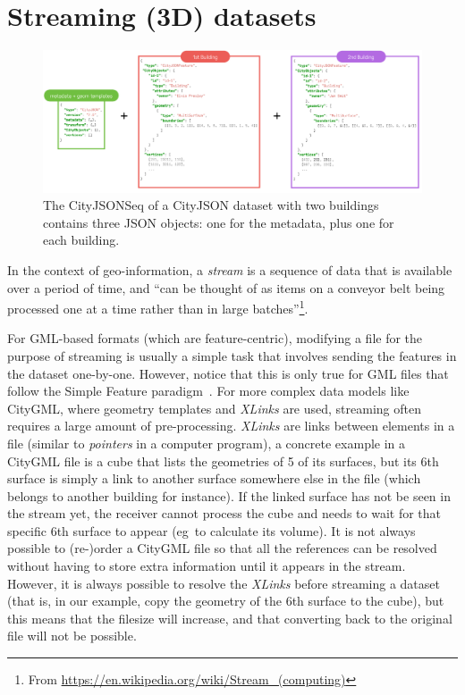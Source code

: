 \documentclass{isprs} %
\newcommand{\eg}{eg}
\begin{document}
\section{Streaming (3D) datasets}%
\label{sec:streaming}
\begin{figure}[th]
  \centering
  \includegraphics[width=0.95\linewidth]{figs/cjseq_idea}
  \caption{The CityJSONSeq of a CityJSON dataset with two buildings contains three JSON objects: one for the metadata, plus one for each building.}%
\label{fig:cjseq_idea}
\end{figure}
In the context of geo-information, a \emph{stream} is a sequence of data that is available over a period of time, and ``can be thought of as items on a conveyor belt being processed one at a time rather than in large batches''\footnote{From \url{https://en.wikipedia.org/wiki/Stream_(computing)}}.

%

For GML-based formats (which are feature-centric), modifying a file for the purpose of streaming is usually a simple task that involves sending the features in the dataset one-by-one.
However, notice that this is only true for GML files that follow the Simple Feature paradigm~\citep{OGC-SF}.
For more complex data models like CityGML, where geometry templates and \emph{XLinks} are used, streaming often requires a large amount of pre-processing.
\emph{XLinks} are links between elements in a file (similar to \emph{pointers} in a computer program), a concrete example in a CityGML file is a cube that lists the geometries of 5 of its surfaces, but its 6th surface is simply a link to another surface somewhere else in the file (which belongs to another building for instance).
If the linked surface has not be seen  in the stream yet, the receiver cannot process the cube and needs to wait for that specific 6th surface to appear (\eg\ to calculate its volume).
It is not always possible to (re-)order a CityGML file so that all the references can be resolved without having to store extra information until it appears in the stream.
However, it is always possible to resolve the \emph{XLinks} before streaming a dataset (that is, in our example, copy the geometry of the 6th surface to the cube), but this means that the filesize will increase, and that converting back to the original file will not be possible.
\end{document}
